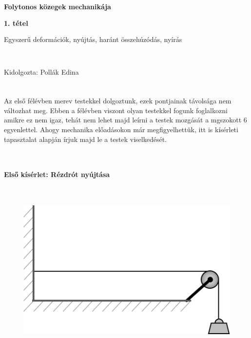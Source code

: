 \documentclass[a4paper, 12pt]{article}
\begin{document}
\begin{titlepage}\centering
\vspace*{250 pt}
\Huge \textbf{Folytonos közegek mechanikája}

\LARGE \textbf{1. tétel}

\LARGE Egyszerű deformációk, nyújtás, haránt összehúzódás, nyírás


~

\LARGE Kidolgozta: Pollák Edina

\vspace*{\fill}
\end{titlepage}

\newpage
\part*{\Large{}}

\vspace{30 pt}

Az első félévben merev testekkel dolgoztunk, ezek pontjainak távolsága nem változhat meg. Ebben a félévben viszont olyan testekkel fogunk foglalkozni amikre ez nem igaz, tehát nem lehet majd leírni a testek mozgását a mgszokott 6 egyenlettel. Ahogy mechanika előadásokon már megfigyelhettük, itt is kísérleti tapasztalat alapján írjuk majd le a testek viselkedését.

~

\subsection*{Első kísérlet: Rézdrót nyújtása}

~

\begin{figure}[h]
\centering
\includegraphics[scale=0.5]{tetel1_1.png}
\caption{}
\end{figure}
\end{document}
